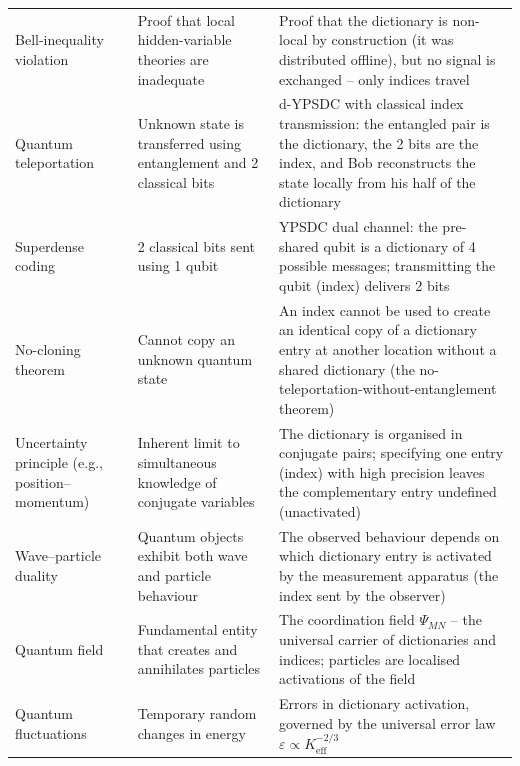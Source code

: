 \documentclass[12pt,a4paper]{article}
\theoremstyle{remark}
\begin{document}
\begin{longtable}{p{3.5cm} p{5cm} p{7cm}}
		Bell-inequality violation &
		Proof that local hidden-variable theories are inadequate &
		Proof that the dictionary is non-local by construction (it was distributed offline), but no signal is exchanged -- only indices travel \\
		\addlinespace
		
		Quantum teleportation &
		Unknown state is transferred using entanglement and 2 classical bits &
		d-YPSDC with classical index transmission: the entangled pair is the dictionary, the 2 bits are the index, and Bob reconstructs the state locally from his half of the dictionary \\
		\addlinespace
		
		Superdense coding &
		2 classical bits sent using 1 qubit &
		YPSDC dual channel: the pre-shared qubit is a dictionary of 4 possible messages; transmitting the qubit (index) delivers 2 bits \\
		\addlinespace
		
		No-cloning theorem &
		Cannot copy an unknown quantum state &
		An index cannot be used to create an identical copy of a dictionary entry at another location without a shared dictionary (the no-teleportation-without-entanglement theorem) \\
		\addlinespace
		
		Uncertainty principle (e.g., position--momentum) &
		Inherent limit to simultaneous knowledge of conjugate variables &
		The dictionary is organised in conjugate pairs; specifying one entry (index) with high precision leaves the complementary entry undefined (unactivated) \\
		\addlinespace
		
		Wave--particle duality &
		Quantum objects exhibit both wave and particle behaviour &
		The observed behaviour depends on which dictionary entry is activated by the measurement apparatus (the index sent by the observer) \\
		\addlinespace
		
		Quantum field &
		Fundamental entity that creates and annihilates particles &
		The coordination field \(\Psi_{MN}\) -- the universal carrier of dictionaries and indices; particles are localised activations of the field \\
		\addlinespace
		
		Quantum fluctuations &
		Temporary random changes in energy &
		Errors in dictionary activation, governed by the universal error law \(\varepsilon \propto K_{\mathrm{eff}}^{-2/3}\) \\
	\end{longtable}
	
\end{document}
